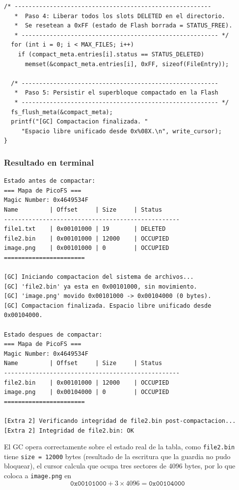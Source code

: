 \documentclass[12pt,letterpaper]{article}
\begin{document}
\begin{lstlisting}[style=modernc, caption={Implementación de \texttt{fs\_compact}: ordenamiento y relocalización}]
  /* --------------------------------------------------------
   *  Paso 4: Liberar todos los slots DELETED en el directorio.
   *  Se resetean a 0xFF (estado de Flash borrada = STATUS_FREE).
   * -------------------------------------------------------- */
  for (int i = 0; i < MAX_FILES; i++)
    if (compact_meta.entries[i].status == STATUS_DELETED)
      memset(&compact_meta.entries[i], 0xFF, sizeof(FileEntry));
  
  /* --------------------------------------------------------
   *  Paso 5: Persistir el superbloque compactado en la Flash
   * -------------------------------------------------------- */
  fs_flush_meta(&compact_meta);
  printf("[GC] Compactacion finalizada. "
	 "Espacio libre unificado desde 0x%08X.\n", write_cursor);
}
\end{lstlisting}

\bigskip

\subsubsection*{Resultado en terminal}

\begin{Verbatim}[frame=single, fontsize=\footnotesize]
Estado antes de compactar:
=== Mapa de PicoFS ===
Magic Number: 0x4649534F
Name         | Offset     | Size     | Status
--------------------------------------------------
file1.txt    | 0x00101000 | 19       | DELETED
file2.bin    | 0x00101000 | 12000    | OCCUPIED
image.png    | 0x00101000 | 0        | OCCUPIED
=======================

[GC] Iniciando compactacion del sistema de archivos...
[GC] 'file2.bin' ya esta en 0x00101000, sin movimiento.
[GC] 'image.png' movido 0x00101000 -> 0x00104000 (0 bytes).
[GC] Compactacion finalizada. Espacio libre unificado desde 0x00104000.

Estado despues de compactar:
=== Mapa de PicoFS ===
Magic Number: 0x4649534F
Name         | Offset     | Size     | Status
--------------------------------------------------
file2.bin    | 0x00101000 | 12000    | OCCUPIED
image.png    | 0x00104000 | 0        | OCCUPIED
=======================

[Extra 2] Verificando integridad de file2.bin post-compactacion...
[Extra 2] Integridad de file2.bin: OK
\end{Verbatim}

\bigskip

El GC opera correctamente sobre el estado real de la tabla, como \texttt{file2.bin} tiene \texttt{size = 12000}
bytes (resultado de la escritura que la guardia no pudo bloquear), el cursor calcula que ocupa tres sectores de
4096 bytes, por lo que coloca a \texttt{image.png} en
\[
\mathtt{0x00101000} + 3 \times 4096 = \mathtt{0x00104000}
\]
\end{document}
